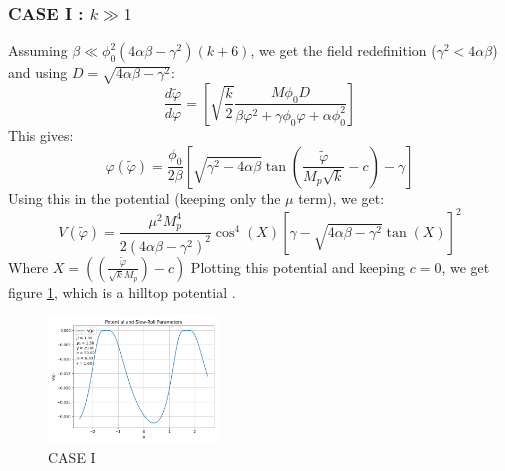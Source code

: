 \documentclass[aps,prd,reprint,preprintnumbers,showpacs,floatfix,nofootinbib,superscript address]{revtex4-2}
\begin{document}
\subsubsection{\textbf{CASE I }: $k \gg 1$}

Assuming $\beta \ll \phi_0^2(4\alpha\beta - \gamma^2)(k+6)$, we get the field redefinition ($\gamma^2 <4\alpha\beta$) and using $D = \sqrt{4\alpha\beta-\gamma^2}$:
\begin{equation}
    \frac{d\tilde{\varphi}}{d\varphi} = \left[ \sqrt{\frac{k}{2}} \frac{M \phi_0 D}{\beta \varphi^2  +\gamma \phi_0 \varphi +\alpha \phi^2_0} \right]
\end{equation}
This gives:
\begin{equation}
    \varphi(\tilde{\varphi}) = \frac{\phi_0}{2\beta} \left[ \sqrt{\gamma^2 - 4\alpha \beta} \tan\left(\frac{\tilde{\varphi}}{M_p\sqrt{k}}-c \right) -\gamma \right]
\end{equation}
Using this in the potential (keeping only the $\mu$ term), we get:
\begin{equation}
    V(\tilde{\varphi}) =  \frac{\mu^2 M_p^4}{2(4\alpha\beta-\gamma^2)^2} \cos^4(X)  \left [ \gamma - \sqrt{4\alpha\beta- \gamma^2} \tan(X)\right]^2
\end{equation}
Where $X = \left(\left(\frac{\tilde{\varphi}}{\sqrt{k}M_p}\right) - c\right)$
Plotting this potential and keeping $c = 0$, we get figure \ref{CASE I potential (HillTop Potential)}, which is a hilltop potential \cite{boubekeur_hilltop_2005}. 
\begin{figure}[h!]
    \centering
    \includegraphics[width=0.4\textwidth]{Python/Figures/Case1 Potential.png}
    \caption{CASE I}
    \label{CASE I potential (HillTop Potential)}
\end{figure}
\end{document}
